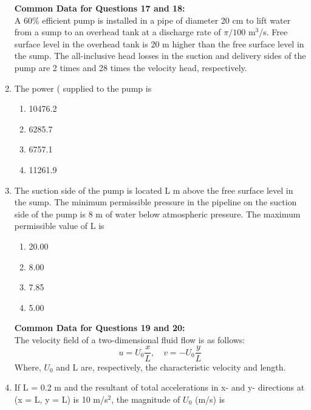\documentclass[a4paper,10pt]{article}
\begin{document}
\begin{enumerate}
\textbf{Common Data for Questions 17 and 18:} \\
A 60\% efficient pump is installed in a pipe of diameter 20 cm to lift water from a sump to an overhead tank at a discharge rate of $\pi/100$ m$^3$/s. Free surface level in the overhead tank is 20 m higher than the free surface level in the sump. The all-inclusive head losses  in the suction and delivery sides of the pump are 2 times and 28 times the velocity head, respectively.

\item The power ( supplied to the pump is
\hfill{}

\begin{multicols}{4}
\begin{enumerate}
\item 10476.2
\item 6285.7
\item 6757.1
\item 11261.9
\end{enumerate}
\end{multicols}

\item The suction side of the pump is located L m above the free surface level in the sump. The minimum permissible pressure in the pipeline on the suction side of the pump is 8 m of water below atmospheric pressure. The maximum permissible value of L is
\hfill{}

\begin{multicols}{4}
\begin{enumerate}
\item 20.00
\item 8.00
\item 7.85
\item 5.00
\end{enumerate}
\end{multicols}

\textbf{Common Data for Questions 19 and 20:} \\
The velocity field of a two-dimensional fluid flow is as follows:
\[ u = U_0 \frac{x}{L}, \quad v = -U_0 \frac{y}{L} \]
Where, $U_0$ and L are, respectively, the characteristic velocity and length.

\item If L = 0.2 m and the resultant of total accelerations in x- and y- directions at (x = L, y = L) is 10 m/s$^2$, the magnitude of $U_0$ (m/s) is
\hfill{}


\end{enumerate}
\end{document}
